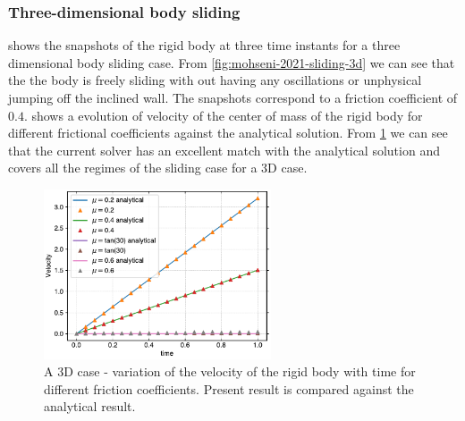 \subsubsection{Three-dimensional body sliding}
\label{sec:results-3d-sliding}

 shows the snapshots of the rigid body at
three time instants for a three dimensional body sliding case. From
\cref{fig:mohseni-2021-sliding-3d} we can see that the the body is freely
sliding with out having any oscillations or unphysical jumping off the inclined
wall. The snapshots correspond to a friction coefficient of $0.4$.
 shows a evolution of
velocity of the center of mass of the rigid body for different frictional
coefficients against the analytical solution. From
\cref{fig:results-solid-sliding-velocity-vs-time-3d} we can see that the current
solver has an excellent match with the analytical solution and covers all the
regimes of the sliding case for a 3D case.
\begin{figure}[!htpb]
  \centering
  \includegraphics[width=0.6\textwidth]{figures/rfc/figures/mohseni_2021_free_sliding_on_a_slope_3d/velocity_vs_time}
  \caption{A 3D case - variation of the velocity of the rigid body with time for different
    friction coefficients. Present result is compared against the analytical
    result.}
\label{fig:results-solid-sliding-velocity-vs-time-3d}
\end{figure}

